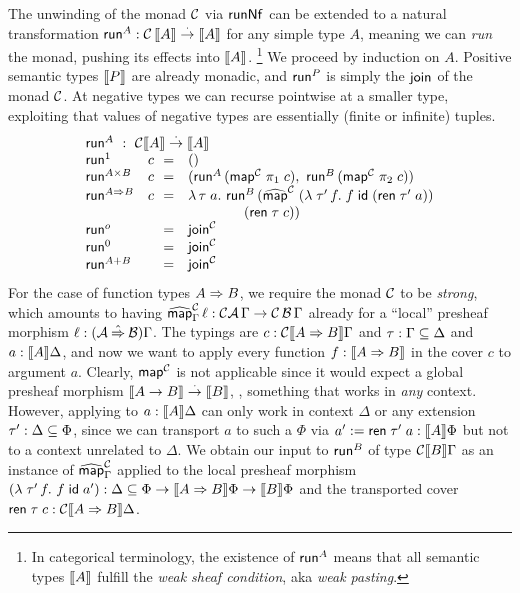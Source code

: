 \documentclass[sigplan,screen]{acmart}
\begin{document}
The unwinding of the monad $\C$ via $\trunNf$ can be extended to a
natural transformation $\trun^A : \C\,\den A \todot \den A$ for any simple
type $A$, meaning we can \emph{run} the monad,
pushing its effects into $\den A$.%
\footnote{In categorical terminology, the existence of
$\trun^A$ means that
all semantic types $\den{A}$ fulfill the \emph{weak sheaf condition},
aka \emph{weak pasting}.}
We proceed by induction on $A$.
Positive semantic types $\den P$ are already monadic,
and $\trun^P$ is simply the $\tjoin$ of the monad $\C$.
At negative types we can recurse pointwise at a smaller type,
exploiting that values of negative types are essentially
(finite or infinite) tuples.
\[
\begin{array}{ll@{~~}cl}%
  \multicolumn 4 l {\trun^A ~:~ \C \den A \todot \den A} \\
  \trun^{\tyone} & c & = & \ttempty
    \\
  \trun^{A \times B} & c & = &
      (\trun^A\,(\tmap[\C]\;\pi_1\;c),\
       \trun^B\,(\tmap[\C]\;\pi_2\;c))
  \\
  \trun^{A \To B} & c  & = & \lambda \,\tau \; a. \ \trun^B\,
      (\stmap[\C]\;(\lambda\;\tau'\,f.\;f\;\tid\;(\tren\;\tau'\;a))
  \\ &&& \qquad \qquad (\tren\;\tau\;c))
  \\
  \trun^{o}      & & = & \tjoin[\C]
  \\
  \trun^{\tyzero} & & = & \tjoin[\C]
  \\
  \trun^{A + B}   & & = & \tjoin[\C]
  \\
\end{array}
\]
For the case of function types $A \To B$, we require the monad $\C$ to be
\emph{strong}, which amounts to having
$\stmap[\C]_\Gamma\, \ell : \C\A\,\Gamma \to \C\,\B\,\Gamma$ already for
a ``local'' presheaf morphism $\ell : (\A \hatto \B)\Gamma$.
The typings are
$c : \C \den{A \To B} \Gamma$ and
$\tau : \Gamma \sublist \Delta$ and
$a : \den A \Delta$, and now we want to apply every function
$f : \den{A \To B}$ in the cover $c$ to argument $a$.  Clearly,
$\tmap[\C]$ is not applicable since it would expect a
global presheaf morphism
$\den{A \to B} \todot \den B$, \ie, something that works in \emph{any}
context.  However, applying to $a : \den A \Delta$ can only work in
context $\Delta$ or any extension $\tau' : \Delta \sublist \Phi$,
since we can transport $a$ to such a $\Phi$ via
$a' := \tren\; \tau'\; a : \den A \Phi$ but not to a context unrelated to
$\Delta$.  We obtain our input to $\trun^B$ of type $\C \den B \Gamma$
as an instance of $\stmap[\C]_\Gamma$ applied to the local presheaf morphism
$(\lambda \; \tau'\, f. \  f\;\tid\;a') :
\Delta \sublist \Phi \to  \den{A \To B}\Phi \to \den B \Phi$
and the transported cover $\tren\;\tau\;c : \C\den{A \To B}\Delta$.
\end{document}

